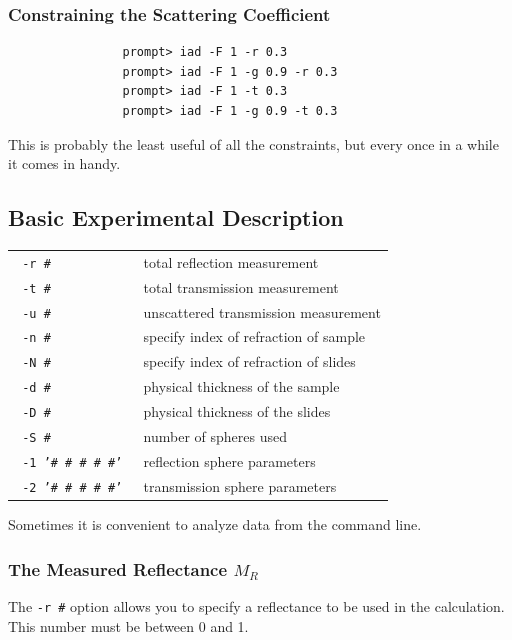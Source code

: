 \documentclass{article}
\begin{document}
\subsubsection{Constraining the Scattering Coefficient}
\label{Fscat}
\begin{verbatim}
                prompt> iad -F 1 -r 0.3
                prompt> iad -F 1 -g 0.9 -r 0.3
                prompt> iad -F 1 -t 0.3
                prompt> iad -F 1 -g 0.9 -t 0.3
\end{verbatim}
This is probably the least useful of all the constraints, but every once
in a while it comes in handy.  


\subsection{Basic Experimental Description}

\begin{center}
\begin{tabular}{lp{7cm}}
\texttt{ -r \#               }& total reflection measurement               \\
\texttt{ -t \#               }& total transmission measurement             \\
\texttt{ -u \#               }& unscattered transmission measurement       \\[3mm]
\texttt{ -n \#               }& specify index of refraction of sample      \\
\texttt{ -N \#               }& specify index of refraction of slides      \\
\texttt{ -d \#               }& physical thickness of the sample           \\
\texttt{ -D \#               }& physical thickness of the slides           \\
\texttt{ -S \#               }& number of spheres used                     \\
\texttt{ -1 '\# \# \# \# \#' }& reflection sphere parameters               \\
\texttt{ -2 '\# \# \# \# \#' }& transmission sphere parameters             \\
\end{tabular}
\end{center}

Sometimes it is convenient to analyze data from the command line.

\subsubsection{The Measured Reflectance $M_R$}
The \texttt{-r \#} option allows you to specify a reflectance to be
used in the calculation.  This number must be between 0 and 1.
\end{document}

